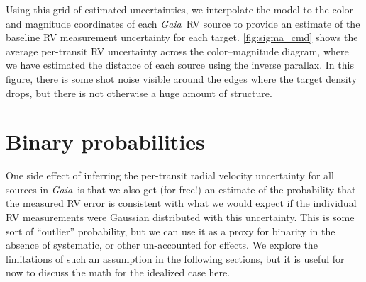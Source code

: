 \documentclass[modern, letterpaper]{aastex631}
\newcommand{\project}[1]{\textsl{#1}}
\newcommand{\Gaia}{\project{Gaia}}
\begin{document}

Using this grid of estimated uncertainties, we interpolate the model to the color and magnitude coordinates of each \Gaia\ RV source to provide an estimate of the baseline RV measurement uncertainty for each target.
\autoref{fig:sigma_cmd} shows the average per-transit RV uncertainty across the color--magnitude diagram, where we have estimated the distance of each source using the inverse parallax.
In this figure, there is some shot noise visible around the edges where the target density drops, but there is not otherwise a huge amount of structure.


\section{Binary probabilities}

One side effect of inferring the per-transit radial velocity uncertainty for all sources in \Gaia\ is that we also get (for free!) an estimate of the probability that the measured RV error is consistent with what we would expect if the individual RV measurements were Gaussian distributed with this uncertainty.
This is some sort of ``outlier'' probability, but we can use it as a proxy for binarity in the absence of systematic, or other un-accounted for effects.
We explore the limitations of such an assumption in the following sections, but it is useful for now to discuss the math for the idealized case here.
\end{document}
